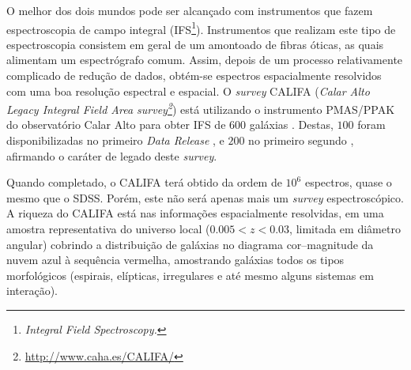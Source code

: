 O melhor dos dois mundos pode ser alcançado com instrumentos que fazem
espectroscopia de campo integral (IFS\footnote{\em Integral Field
Spectroscopy.}). Instrumentos que realizam este tipo de espectroscopia consistem
em geral de um amontoado de fibras óticas, as quais alimentam um espectrógrafo
comum. Assim, depois de um processo relativamente complicado de redução de
dados, obtém-se espectros espacialmente resolvidos com uma boa resolução
espectral e espacial. O {\em survey} CALIFA ({\em Calar Alto Legacy Integral
Field Area survey\footnote{\url{http://www.caha.es/CALIFA/}}}) está utilizando o
instrumento PMAS/PPAK do observatório Calar Alto para obter IFS de $600$
galáxias \citep{Sanchez2012}. Destas, $100$ foram disponibilizadas no primeiro
{\em Data Release} \citep[DR1]{Husemann2013}, e $200$ no primeiro segundo
\citep{GarciaBenito2015}, afirmando o caráter de legado deste {\em survey}.

Quando completado, o CALIFA terá obtido da ordem de $10^6$ espectros, quase o
mesmo que o SDSS. Porém, este não será apenas mais um {\em survey}
espectroscópico. A riqueza do CALIFA está nas informações espacialmente
resolvidas, em uma amostra representativa do universo local ($0.005 < z < 0.03$,
limitada em diâmetro angular) cobrindo a distribuição de galáxias no diagrama
cor--magnitude da nuvem azul à sequência vermelha, amostrando galáxias todos os
tipos morfológicos (espirais, elípticas, irregulares e até mesmo alguns sistemas
em interação).


